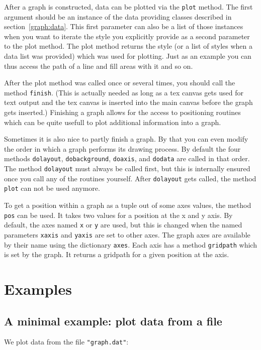 After a graph is constructed, data can be plotted via the \verb|plot|
method. The first argument should be an instance of the data providing
classes described in section~\ref{graph:data}. This first parameter
can also be a list of those instances when you want to iterate the
style you explicitly provide as a second parameter to the plot method.
The plot method returns the style (or a list of styles when a data
list was provided) which was used for plotting. Just as an example you
can thus access the path of a line and fill areas with it and so on.

After the plot method was called once or several times, you should
call the method \verb|finish|. (This is actually needed as long as a
tex canvas gets used for text output and the tex canvas is inserted
into the main canvas before the graph gets inserted.) Finishing a
graph allows for the access to positioning routines which can be quite
usefull to plot additional information into a graph.

Sometimes it is also nice to partly finish a graph. By that you can
even modify the order in which a graph performs its drawing process.
By default the four methods \verb|dolayout|, \verb|dobackground|,
\verb|doaxis|, and \verb|dodata| are called in that order. The method
\verb|dolayout| must always be called first, but this is internally
ensured once you call any of the routines yourself. After
\verb|dolayout| gets called, the method \verb|plot| can not be used
anymore.

To get a position within a graph as a tuple out of some axes values,
the method \verb|pos| can be used. It takes two values for a position
at the x and y axis. By default, the axes named \verb|x| or \verb|y|
are used, but this is changed when the named parameters \verb|xaxis|
and \verb|yaxis| are set to other axes. The graph axes are available
by their name using the dictionary \verb|axes|. Each axis has a method
\verb|gridpath| which is set by the graph. It returns a gridpath for a
given position at the axis.

\section{Examples}

\subsection{A minimal example: plot data from a file}

We plot data from the file \verb|"graph.dat"|:

